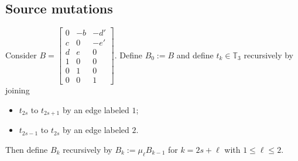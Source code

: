 \documentclass{amsart}
\numberwithin{theorem}{section}
\newcommand{\TT}{\mathbb{T}}
\begin{document}
  \subsection{Source mutations}

  Consider $B=\left[\begin{array}{ccc} 0 & -b & -d' \\ c & 0 & -e'\\ d & e & 0\\ 1 & 0 & 0\\ 0 & 1 & 0\\ 0 & 0 & 1\end{array}\right]$.
  Define $B_0:=B$ and define $t_k\in\TT_3$ recursively by joining 
  \begin{itemize}
    \item $t_{2s}$ to $t_{2s+1}$ by an edge labeled $1$;
    \item $t_{2s-1}$ to $t_{2s}$ by an edge labeled $2$.
  \end{itemize}
  Then define $B_k$ recursively by $B_k:=\mu_\ell B_{k-1}$ for $k=2s+\ell$ with $1\le\ell\le 2$.
\end{document}
